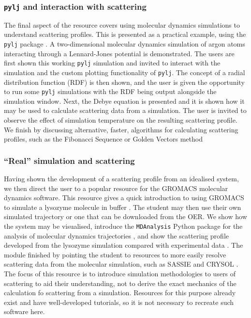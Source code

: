 \subsubsection{\texttt{pylj} and interaction with scattering}
The final aspect of the resource covers using molecular dynamics simulations to understand scattering profiles.
This is presented as a practical example, using the \texttt{pylj} package \cite{mccluskey_pylj_2018,mccluskey_arm61/pylj_2019-2}.
A two-dimensional molecular dynamics simulation of argon atoms interacting through a Lennard-Jones potential is demonstrated.
The users are first shown this working \texttt{pylj} simulation and invited to interact with the simulation and the custom plotting functionality of \texttt{pylj}.
The concept of a radial distribution function (RDF) is then shown, and the user is given the opportunity to run some \texttt{pylj} simulations with the RDF being output alongside the simulation window.
Next, the Debye equation \cite{debye_zerstreuung_1915} is presented and it is shown how it may be used to calculate scattering data from a simulation.
The user is invited to observe the effect of simulation temperature on the resulting scattering profile.
We finish by discussing alternative, faster, algorithms for calculating scattering profiles, such as the Fibonacci Sequence or Golden Vectors method \cite{watson_rapid_2013,svergun_solution_1994}

\subsubsection{``Real'' simulation and scattering}
Having shown the development of a scattering profile from an idealised system, we then direct the user to a popular resource for the GROMACS \cite{berendsen_gromacs_1995} molecular dynamics software.
This resource gives a quick introduction to using GROMACS to simulate a lysozyme molecule in buffer \cite{lemkul_gromacs_nodate}.
The student may then use their own simulated trajectory or one that can be downloaded from the OER.
We show how the system may be visualised, introduce the \texttt{MDAnalysis} Python package for the analysis of molecular dynamics trajectories \cite{michaud-agrawal_mdanalysis_2011,gowers_mdanalysis_2016}, and show the scattering profile developed from the lysozyme simulation compared with experimental data \cite{franke_correlation_2015}.
The module finished by pointing the student to resources to more easily resolve scattering data from the molecular simulation, such as SASSIE and CRYSOL \cite{perkins_atomistic_2016,svergun_crysol_1995}.
The focus of this resource is to introduce simulation methodologies to users of scattering to aid their understanding, not to derive the exact mechanics of the calculation fo scattering from a simulation.
Resources for this purpose already exist and have well-developed tutorials, so it is not necessary to recreate such software here.
